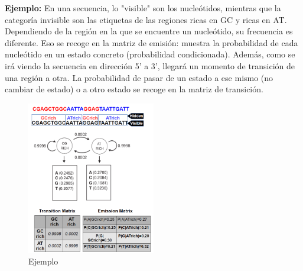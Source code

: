 \textbf{Ejemplo:}
En una secuencia, lo "visible" son los nucleótidos, mientras que la categoría invisible son las etiquetas de las regiones ricas en GC y ricas en AT. Dependiendo de la región en la que se encuentre un nucleótido, su frecuencia es diferente. Eso se recoge en la matriz de emisión: muestra la probabilidad de cada nucleótido en un estado concreto (probabilidad condicionada). Además, como se irá viendo la secuencia en dirección 5' a 3', llegará un momento de transición de una región a otra. La probabilidad de pasar de un estado a ese mismo (no cambiar de estado) o a otro estado se recoge en la matriz de transición.

\begin{figure}[htbp]
\centering
\includegraphics[width = 0.5\textwidth]{figs/transition-emission.png}
\caption{Ejemplo}
\end{figure}

